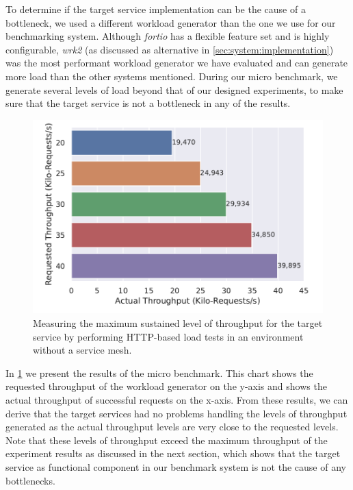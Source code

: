 To determine if the target service implementation can be the cause of a bottleneck, we used a different workload generator than the one we use for our benchmarking system. Although \textit{fortio} has a flexible feature set and is highly configurable, \textit{wrk2} (as discussed as alternative in \cref{sec:system:implementation}) was the most performant workload generator we have evaluated and can generate more load than the other systems mentioned. During our micro benchmark, we generate several levels of load beyond that of our designed experiments, to make sure that the target service is not a bottleneck in any of the results.

\begin{figure}[!t]
    \centering
    
    \includegraphics[width=0.8\linewidth]{5_experimental_evaluation/figures/microbench-target-service.pdf}

    \caption[Micro benchmark - Measuring the maximum sustained level of throughput for the target service.]{Measuring the maximum sustained level of throughput for the target service by performing HTTP-based load tests in an environment without a service mesh.}
    
    \label{fig:microbench:target-svc}
\end{figure}

In \cref{fig:microbench:target-svc} we present the results of the micro benchmark. This chart shows the requested throughput of the workload generator on the y-axis and shows the actual throughput of successful requests on the x-axis. From these results, we can derive that the target services had no problems handling the levels of throughput generated as the actual throughput levels are very close to the requested levels. Note that these levels of throughput exceed the maximum throughput of the experiment results as discussed in the next section, which shows that the target service as functional component in our benchmark system is not the cause of any bottlenecks.
